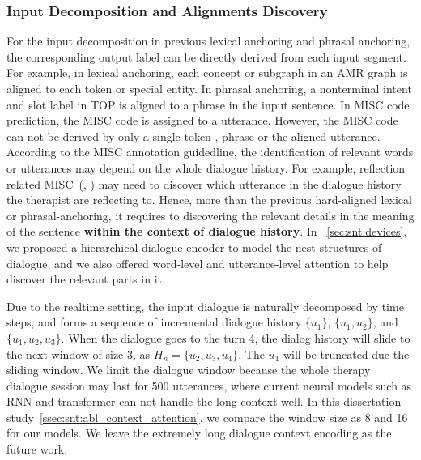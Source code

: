 \subsubsection{Input Decomposition and Alignments Discovery}
\label{sssec:snt:input-decomposition}
For the input decomposition in previous lexical anchoring and
phrasal anchoring, the corresponding output label can be directly
derived from each input segment. For example, in lexical anchoring,
each concept or subgraph in an AMR graph is aligned to each token
or special entity. In phrasal anchoring, a nonterminal intent and
slot label in TOP is aligned to a phrase in the input sentence. In
MISC code prediction, the MISC code is assigned to a
utterance. However, the MISC code can not be derived by only a single token
, phrase or the aligned utterance. According to the MISC annotation
guidedline, the identification of relevant words or utterances may
depend on the whole dialogue history. For example, reflection related
MISC~(\RES, \REC) may need to discover which utterance in the dialogue
history the therapist are reflecting to. Hence, more than the previous
hard-aligned lexical or phrasal-anchoring, it requires to discovering
the relevant details in the meaning of the sentence \textbf{within the
  context of dialogue history}. In ~\autoref{sec:snt:devices}, we
proposed a hierarchical dialogue encoder to model the nest structures
of dialogue, and we also offered word-level and utterance-level
attention to help discover the relevant parts in it.

Due to the realtime setting, the input dialogue is naturally
decomposed by time steps, and forms a sequence of incremental dialogue
history $\{u_1\}$, $\{u_1,u_2\}$, and $\{u_1,u_2,u_3\}$.  When the dialogue goes to the turn 4, the dialog history will
slide to the next window of size 3, as $H_{n}=\{u_2,u_3,u_4\}$. The
$u_{1}$ will be truncated due the sliding window. We limit the
dialogue window because the whole therapy dialogue session may last
for 500 utterances, where current neural models such as RNN and
transformer can not handle the long context well.  In this dissertation
study~\autoref{ssec:snt:abl_context_attention}, we compare the window
size as 8 and 16 for our models. We leave the extremely long dialogue
context encoding as the future work.

